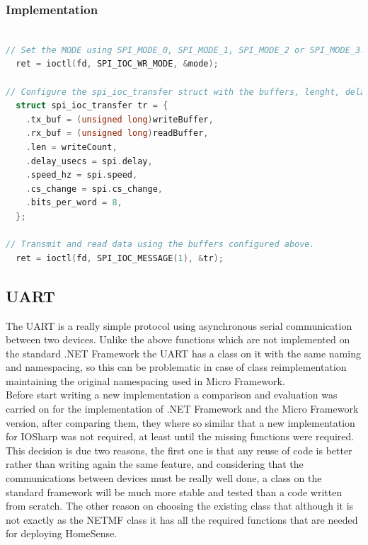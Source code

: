\subsubsection{Implementation}\label{SSS:IOSharp-SPI-Implementation}

\begin{lstlisting}[language=C, caption={IOSharp.c - SPI interesting function parts}]

// Set the MODE using SPI_MODE_0, SPI_MODE_1, SPI_MODE_2 or SPI_MODE_3.
  ret = ioctl(fd, SPI_IOC_WR_MODE, &mode);

// Configure the spi_ioc_transfer struct with the buffers, lenght, delay, bits per word and chip select changing.
  struct spi_ioc_transfer tr = {
    .tx_buf = (unsigned long)writeBuffer,
    .rx_buf = (unsigned long)readBuffer,
    .len = writeCount,
    .delay_usecs = spi.delay,
    .speed_hz = spi.speed,
    .cs_change = spi.cs_change,
    .bits_per_word = 8,
  };

// Transmit and read data using the buffers configured above.
  ret = ioctl(fd, SPI_IOC_MESSAGE(1), &tr);
\end{lstlisting}

\subsection{UART}\label{SS:IOSharp-UART}
The UART is a really simple protocol using asynchronous serial communication between two devices. Unlike the above functions which are not implemented on the standard .NET Framework the UART has a class on it with the same naming and namespacing, so this can be problematic in case of class reimplementation maintaining the original namespacing used in Micro Framework.
\\
Before start writing a new implementation a comparison and evaluation was carried on for the implementation of .NET Framework and the Micro Framework version, after comparing them, they where so similar that a new implementation for IOSharp was not required, at least until the missing functions were required. This decision is due two reasons, the first one is that any reuse of code is better rather than writing again the same feature, and considering that the communications between devices must be really well done, a class on the standard framework will be much more stable and tested than a code written from scratch. The other reason on choosing the existing class that although it is not exactly as the NETMF class it has all the required functions that are needed for deploying HomeSense.

